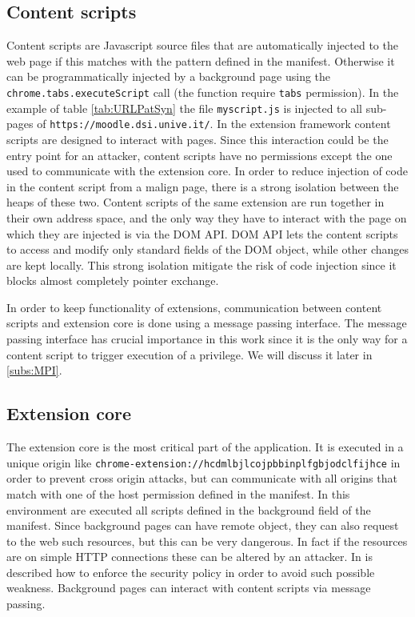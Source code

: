 \subsection{Content scripts}
Content scripts are Javascript source files that are automatically injected to the web page if this matches with the pattern defined in the manifest. Otherwise it can be programmatically injected by a background page using the \texttt{chrome.tabs.executeScript} call (the function require \texttt{tabs} permission). In the example of table \ref{tab:URLPatSyn} the file \texttt{myscript.js} is injected to all sub-pages of \texttt{https://moodle.dsi.unive.it/}. In the extension framework content scripts are designed to interact with pages. Since this interaction could be the entry point for an attacker, content scripts have no permissions except the one used to communicate with the extension core. In order to reduce injection of code in the content script from a malign page, there is a strong isolation between the heaps of these two. Content scripts of the same extension are run together in their own address space, and the only way they have to interact with the page on which they are injected is via the DOM API. DOM API lets the content scripts to access and modify only standard fields of the DOM object, while other changes are kept locally\cite{ChromeExtSpec}. This strong isolation mitigate the risk of code injection since it blocks almost completely pointer exchange. 

In order to keep functionality of extensions, communication between content scripts and extension core is done using a message passing interface. The message passing interface has crucial importance in this work since it is the only way for a content script to trigger execution of a privilege. We will discuss it later in \ref{subs:MPI}.

\subsection{Extension core}
The extension core is the most critical part of the application. It is executed in a unique origin like \texttt{chrome-extension://hcdmlbjlcojpbbinplfgbjodclfijhce} in order to prevent cross origin attacks, but can communicate with all origins that match with one of the host permission defined in the manifest. In this environment are executed all scripts defined in the background field of the manifest. Since background pages can have remote object, they can also request to the web such resources, but this can be very dangerous. In fact if the resources are on simple HTTP connections these can be altered by an attacker. In \cite{ChromeExtSpecSnd} is described how to enforce the security policy in order to avoid such possible weakness. Background pages can interact with content scripts via message passing.

